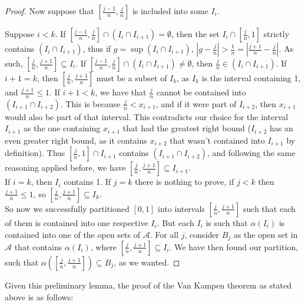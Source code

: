 \documentclass[12pt,a4paper]{article}
\begin{document}
\begin{proof}
Now suppose that $[\frac{j-1}{n}, \frac{j}{n}]$ is included into some $I_i$. 

Suppose $i < k$. If $[\frac{j-1}{n},\frac{j}{n}] \cap (I_i \cap I_{i+1}) = \emptyset$, then the set $I_i \cap [\frac{j}{n}, 1]$ strictly contains $(I_i \cap I_{i+1})$, thus if $g = \sup (I_i \cap I_{i+1})$, $|g-\frac{j}{n}|> \frac{1}{n} = |\frac{j+1}{n} - \frac{j}{n}|$. As such,
$[\frac{j}{n}, \frac{j+1}{n}] \subseteq I_i$. If $[\frac{j-1}{n}, \frac{j}{n}] \cap (I_i \cap I_{i+1}) \neq \emptyset$, then $\frac{j}{n} \in (I_i \cap I_{i+1})$. If $i+1 = k$, then $[\frac{j}{n}, \frac{j+1}{n}]$ must be a subset of $I_k$, as $I_k$ is the interval containing 1, and $\frac{j+1}{n} \leq 1$. If $i+1 < k$, we have that $\frac{j}{n}$ cannot be contained into $(I_{i+1} \cap I_{i+2})$. This is because $\frac{j}{n} < x_{i+1}$, and if it were part of $I_{i+2}$, then $x_{i+1}$ would also be part of that interval. This contradicts our choice for the interval $I_{i+1}$ as the one containing $x_{i+1}$ that had the greatest right bound ($I_{i+2}$ has an even greater right bound, as it contains $x_{i+2}$ that wasn't contained into $I_{i+1}$ by definition).
Thus $[\frac{j}{n}, 1] \cap I_{i+1}$ contains $(I_{i+1} \cap I_{i+2})$, and following the same reasoning applied before, we have $[\frac{j}{n}, \frac{j+1}{n}] \subseteq I_{i+1}$. \\

If $i = k$, then $I_i$ contains 1. If $j = k$ there is nothing to prove, if $j < k$ then $\frac{j+1}{n} \leq 1$, so $[\frac{j}{n}, \frac{j+1}{n}] \subseteq I_k$.\\
So now we successfully partitioned $[0,1]$ into intervals $[\frac{j}{n}, \frac{j+1}{n}]$ such that each of them is contained into one respective $I_i$. But each $I_i$ is such that $\alpha (I_i)$ is contained into one of the open sets of $\mathcal{A}$. For all $j$, consider $B_j$ as the open set in $\mathcal{A}$ that contains $\alpha(I_i)$, where $[\frac{j}{n}, \frac{j+1}{n}] \subseteq I_i$.  We have then found our partition, such that $\alpha ([\frac{j}{n}, \frac{j+1}{n}]) \subseteq B_j$, as we wanted.
\end{proof}

Given this preliminary lemma, the proof of the Van Kampen theorem as stated above is as follows:
\end{document}
